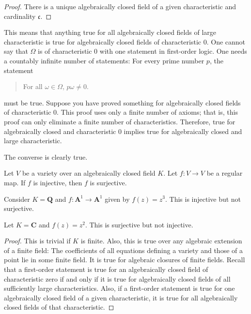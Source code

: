 \documentclass [11 pt, oneside] {article}
\begin{document}
\begin{proof}
There is a unique algebraically closed field of a given characteristic and cardinality $\mathfrak{c}$.
\end{proof}

\begin{remark}
	This means that anything true for all algebraically closed fields of large characteristic is true for algebraically closed fields of characteristic $0$. One cannot say that $\Omega$ is of characteristic $0$ with one statement in first-order logic. One needs a countably infinite number of statements: For every prime number $p$, the statement
	\begin{quote}
		\small 
		For all $\omega\in \Omega$, $p\omega\ne 0$.
	\end{quote}
	must be true. Suppose you have proved something for algebraically closed fields of characteristic $0$. This proof uses only a finite number of axioms; that is, this proof can only eliminate a finite number of characteristics. Therefore, true for algebraically closed and characteristic $0$ implies true for algebraically closed and large characteristic.

	The converse is clearly true.
\end{remark}

\begin{theorem}[Ax--Grothendieck]\label{}
Let $V$ be a variety over an algebraically closed field $K$. Let $f:V\longrightarrow V$ be a regular map. If $f$ is injective, then $f$ is surjective.
\end{theorem}

\begin{example}\label{}
Consider $K= \mathbf{Q}$ and $f:\mathbf{A}^1\longrightarrow \mathbf{A}^1$ given by $f(z)=z^ 3$. This is injective but not surjective.
\end{example}

\begin{example}\label{}
Let $K=\mathbf{C}$ and $f(z)=z^2$. This is surjective but not injective.
\end{example}

\begin{proof}
This is trivial if $K$ is finite. Also, this is true over any algebraic extension of a finite field: The coefficients of all equations defining a variety and those of a point lie in some finite field. It is true for algebraic closures of finite fields. Recall that a first-order statement is true for an algebraically closed field of characteristic zero if and only if it is true for algebraically closed fields of all sufficiently large characteristics. Also, if a first-order statement is true for one algebraically closed field of a given characteristic, it is true for all algebraically closed fields of that characteristic.
\end{proof}
\end{document}
